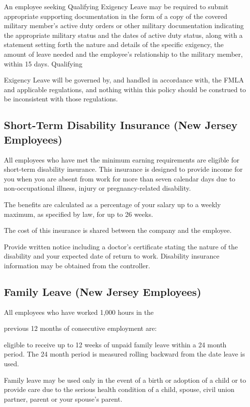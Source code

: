 An employee seeking Qualifying Exigency Leave may be required to submit appropriate supporting documentation in the form of a copy of the covered military member’s active duty orders or other military documentation indicating the appropriate military status and the dates of active duty status, along with a statement setting forth the nature and details of the specific exigency, the amount of leave needed and the employee's relationship to the military member, within 15 days. Qualifying

Exigency Leave will be governed by, and handled in accordance with, the FMLA and applicable regulations, and nothing within this policy should be construed to be inconsistent with those regulations.

\subsection{Short-Term Disability Insurance (New Jersey Employees)}

All employees who have met the minimum earning requirements are eligible for short-term disability insurance. This insurance is designed to provide income for you when you are absent from work for more than seven calendar days due to non-occupational illness, injury or pregnancy-related disability.

The benefits are calculated as a percentage of your salary up to a weekly maximum, as specified by law, for up to 26 weeks.

The cost of this insurance is shared between the company and the employee.

Provide written notice including a doctor's certificate stating the nature of the disability and your expected date of return to work. Disability insurance information may be obtained from the controller.

\subsection{Family Leave (New Jersey Employees)}

All employees who have worked 1,000 hours in the

previous 12 months of consecutive employment are:

eligible to receive up to 12 weeks of unpaid family leave within a 24 month period. The 24 month period is measured rolling backward from the date leave is used.

Family leave may be used only in the event of a birth or adoption of a child or to provide care due to the serious health condition of a child, spouse, civil union partner, parent or your spouse's parent.


